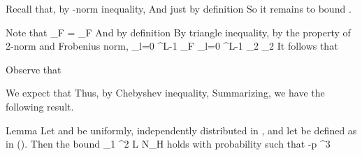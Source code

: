 Recall that, by -norm inequality,
%
%
And just by definition
%
%
So it remains to bound .

Note that
%
 {
\NC {} _F
=\NC {} _F \NR
}
%
And by definition
%
%
By triangle inequality, by the property of 2-norm and Frobenius norm,
%
 {
\NC \leq \NC \sum _{l=0} ^{L-1}
 _F \NR
\NC \leq \NC
\sum _{l=0} ^{L-1} 
 _2
 _2 \NR
}
%
It follows that
%

Observe that
%

We expect that
%
%
Thus, by Chebyshev inequality,
%
%
Summarizing, we have the following result.

\Result
{Lemma}
{
Let \m {\f} and \m {\th} be uniformly, independently distributed in \m {[0,2\pi)},
and let  be defined as in ().
Then the bound
%
 {
\NC {} _1
\leq \NC {} {\pi^2}  L N_H  \NR
}
%
holds with probability  such that
%
 {
 -p
\leq \NC {} { ^3} \NR
}
}

\stopsubsection
\stopsection


